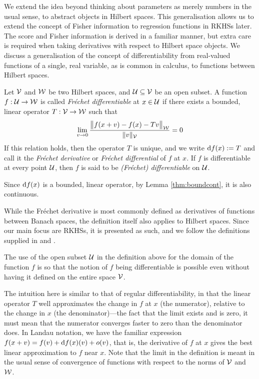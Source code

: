 We extend the idea beyond thinking about parameters as merely numbers in the usual sense, to abstract objects in Hilbert spaces. 
This generalisation allows us to extend the concept of Fisher information to regression functions in RKHSs later.
The score and Fisher information is derived in a familiar manner, but extra care is required when taking derivatives with respect to Hilbert space objects.  
We discuss a generalisation of the concept of differentiability from real-valued functions of a single, real variable, as is common in calculus, to functions between Hilbert spaces.

\begin{definition}\label{def:frechet}
  Let ${\mathcal V}$ and ${\mathcal W}$ be two Hilbert spaces, and ${\mathcal U} \subseteq {\mathcal V}$ be an open subset.
  A function $f:{\mathcal U}\to{\mathcal W}$ is called \emph{Fréchet differentiable} at $x \in {\mathcal U}$ if there exists a bounded, linear operator $T:{\mathcal V}\to{\mathcal W}$ such that 
  \[
    \lim_{v\to 0} \frac{\big\Vert f(x+v) - f(x) - T v \big\Vert_{{\mathcal W}}}{\lVert v\rVert_{\mathcal V}} = 0
  \]
  If this relation holds, then the operator $T$ is unique, and we write $\text{d} f(x) := T$ and call it the \emph{Fréchet derivative} or \emph{Fréchet differential} of $f$ at $x$.
  If $f$ is differentiable at every point ${\mathcal U}$, then $f$ is said to be \emph{(Fréchet) differentiable} on ${\mathcal U}$.
\end{definition}

\begin{remark}
  Since $\text{d} f(x)$ is a bounded, linear operator, by Lemma \cref{thm:boundcont}, it is also continuous. 
\end{remark}

\begin{remark}
  While the Fréchet derivative is most commonly defined as derivatives of functions between Banach spaces,  the definition itself also applies to Hilbert spaces.
  Since our main focus are RKHSs, it is presented as such, and we follow the definitions supplied in \citet[Definition 3.6.5]{balakrishnan1981applied} and \citet[Section 6]{bouboulis2011extension}.
\end{remark}

\begin{remark}
  The use of the open subset ${\mathcal U}$ in the definition above for the domain of the function $f$ is so that the notion of $f$ being differentiable is possible even without having it defined on the entire space ${\mathcal V}$.
\end{remark}

The intuition here is similar to that of regular differentiability, in that the linear operator $T$ well approximates the change in $f$ at $x$ (the numerator), relative to the change in $x$ (the denominator)---the fact that the limit exists and is zero, it must mean that the numerator converges faster to zero than the denominator does.
In Landau notation, we have the familiar expression $f(x+v) = f(v) + \text{d} f(x)(v) + o(v)$, that is, the derivative of $f$ at $x$ gives the best linear approximation to $f$ near $x$.
Note that the limit in the definition is meant in the usual sense of convergence of functions with respect to the norms of ${\mathcal V}$ and ${\mathcal W}$.

